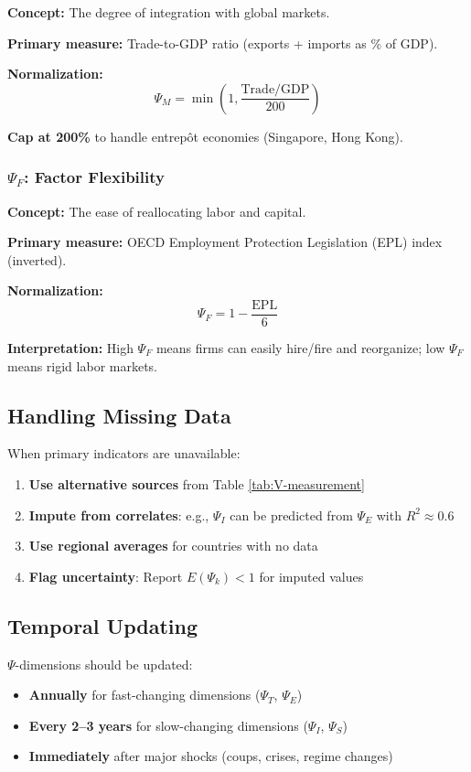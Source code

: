 \textbf{Concept:} The degree of integration with global markets.

\textbf{Primary measure:} Trade-to-GDP ratio (exports + imports as \% of GDP).

\textbf{Normalization:}
\[
\Psi_M = \min\left(1, \frac{\text{Trade/GDP}}{200}\right)
\]

\textbf{Cap at 200\%} to handle entrepôt economies (Singapore, Hong Kong).

\subsubsection{$\Psi_F$: Factor Flexibility}

\textbf{Concept:} The ease of reallocating labor and capital.

\textbf{Primary measure:} OECD Employment Protection Legislation (EPL) index (inverted).

\textbf{Normalization:}
\[
\Psi_F = 1 - \frac{\text{EPL}}{6}
\]

\textbf{Interpretation:} High $\Psi_F$ means firms can easily hire/fire and 
reorganize; low $\Psi_F$ means rigid labor markets.

\subsection{Handling Missing Data}

When primary indicators are unavailable:

\begin{enumerate}
    \item \textbf{Use alternative sources} from Table \ref{tab:V-measurement}
    \item \textbf{Impute from correlates}: e.g., $\Psi_I$ can be predicted from $\Psi_E$ with $R^2 \approx 0.6$
    \item \textbf{Use regional averages} for countries with no data
    \item \textbf{Flag uncertainty}: Report $E(\Psi_k) < 1$ for imputed values
\end{enumerate}

\subsection{Temporal Updating}

$\Psi$-dimensions should be updated:
\begin{itemize}[nosep]
    \item \textbf{Annually} for fast-changing dimensions ($\Psi_T$, $\Psi_E$)
    \item \textbf{Every 2--3 years} for slow-changing dimensions ($\Psi_I$, $\Psi_S$)
    \item \textbf{Immediately} after major shocks (coups, crises, regime changes)
\end{itemize}



